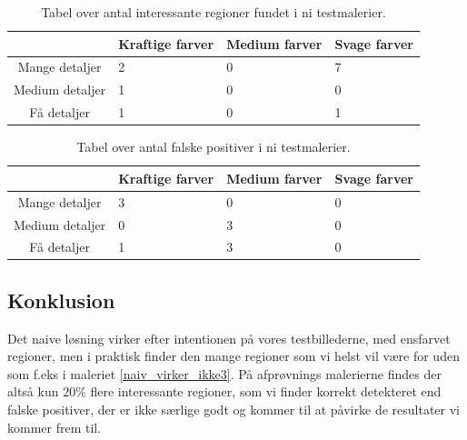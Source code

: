 \begin{table}[H]
    \centering
    \begin{tabular}{|c|l|l|l|}
			\hline
            & Kraftige farver & Medium farver & Svage farver \\\hline
		Mange detaljer	& 2 & 0 & 7 \\\hline
        Medium detaljer  & 1 & 0 & 0 \\\hline
        Få detaljer     & 1 & 0 & 1 \\\hline
    \end{tabular}
    \caption[]{Tabel over antal interessante regioner fundet i ni testmalerier.}
    \label{naiv_good}
\end{table}

\begin{table}[H]
    \centering
    \begin{tabular}{|c|l|l|l|}
			\hline
            & Kraftige farver & Medium farver & Svage farver \\\hline
		Mange detaljer	& 3 & 0 & 0 \\\hline
        Medium detaljer  & 0 & 3 & 0 \\\hline
        Få detaljer     & 1 & 3 & 0 \\\hline
    \end{tabular}
    \caption[]{Tabel over antal falske positiver i ni testmalerier.}
    \label{naiv_bad}
\end{table}

\subsection{Konklusion}
Det naive løsning virker efter intentionen på vores testbillederne, med
ensfarvet regioner, men i praktisk finder den mange regioner som vi
helst vil være for uden som f.eks i maleriet \ref{naiv_virker_ikke3}. På
afprøvnings malerierne findes der altså kun $20\%$ flere interessante
regioner, som vi finder korrekt detekteret end falske positiver, der er
ikke særlige godt og kommer til at påvirke de resultater vi kommer frem til.

